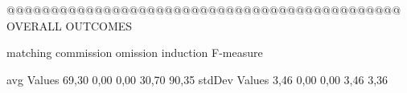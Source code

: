 @@@@@@@@@@@@@@@@@@@@@@@@@@@@@@@@@@@@@@@@@@@@@ OVERALL OUTCOMES

               matching commission   omission  induction  F-measure
               
avg Values      69,30       0,00       0,00      30,70     90,35        
stdDev Values    3,46       0,00       0,00       3,46      3,36        